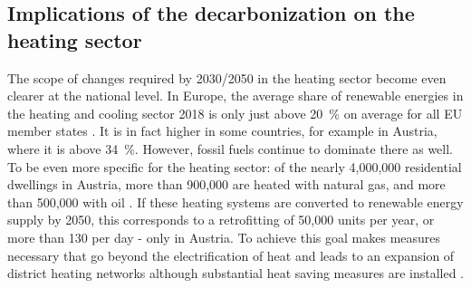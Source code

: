 \subsection{Implications of the decarbonization on the heating sector}
The scope of changes required by 2030/2050 in the heating sector become even clearer at the national level. In Europe, the average share of renewable energies in the heating and cooling sector 2018 is only just above \SI{20}{\%} on average for all EU member states \cite{eurostat_reference}. It is in fact higher in some countries, for example in Austria, where it is above \SI{34}{\%}. However, fossil fuels continue to dominate there as well. To be even more specific for the heating sector: of the nearly 4,000,000 residential dwellings in Austria, more than 900,000 are heated with natural gas, and more than 500,000 with oil \cite{statistik_austria}. If these heating systems are converted to renewable energy supply by 2050, this corresponds to a retrofitting of 50,000 units per year, or more than 130 per day - only in Austria. To achieve this goal makes measures necessary that go beyond the electrification of heat and leads to an expansion of district heating networks although substantial heat saving measures are installed \cite{jalil2018spatially}.\vspace{0.3cm}

